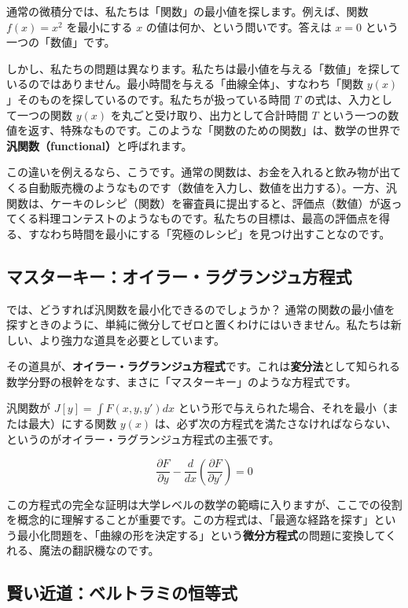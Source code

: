 \documentclass[12pt,a4paper]{ltjsarticle}
\begin{document}
通常の微積分では、私たちは「関数」の最小値を探します。例えば、関数 $f(x) = x^2$ を最小にする $x$ の値は何か、という問いです。答えは $x=0$ という一つの「数値」です。

しかし、私たちの問題は異なります。私たちは最小値を与える「数値」を探しているのではありません。最小時間を与える「曲線全体」、すなわち「関数 $y(x)$」そのものを探しているのです。私たちが扱っている時間 $T$ の式は、入力として一つの関数 $y(x)$ を丸ごと受け取り、出力として合計時間 $T$ という一つの数値を返す、特殊なものです。このような「関数のための関数」は、数学の世界で\textbf{汎関数（functional）}と呼ばれます。

この違いを例えるなら、こうです。通常の関数は、お金を入れると飲み物が出てくる自動販売機のようなものです（数値を入力し、数値を出力する）。一方、汎関数は、ケーキのレシピ（関数）を審査員に提出すると、評価点（数値）が返ってくる料理コンテストのようなものです。私たちの目標は、最高の評価点を得る、すなわち時間を最小にする「究極のレシピ」を見つけ出すことなのです。

\subsection{マスターキー：オイラー・ラグランジュ方程式}

では、どうすれば汎関数を最小化できるのでしょうか？ 通常の関数の最小値を探すときのように、単純に微分してゼロと置くわけにはいきません。私たちは新しい、より強力な道具を必要としています。

その道具が、\textbf{オイラー・ラグランジュ方程式}です。これは\textbf{変分法}として知られる数学分野の根幹をなす、まさに「マスターキー」のような方程式です。

汎関数が $J[y] = \int F(x, y, y') dx$ という形で与えられた場合、それを最小（または最大）にする関数 $y(x)$ は、必ず次の方程式を満たさなければならない、というのがオイラー・ラグランジュ方程式の主張です。

\begin{equation}
\frac{\partial F}{\partial y} - \frac{d}{dx}\left(\frac{\partial F}{\partial y'}\right) = 0
\end{equation}

この方程式の完全な証明は大学レベルの数学の範疇に入りますが、ここでの役割を概念的に理解することが重要です。この方程式は、「最適な経路を探す」という最小化問題を、「曲線の形を決定する」という\textbf{微分方程式}の問題に変換してくれる、魔法の翻訳機なのです。

\subsection{賢い近道：ベルトラミの恒等式}
\end{document}
